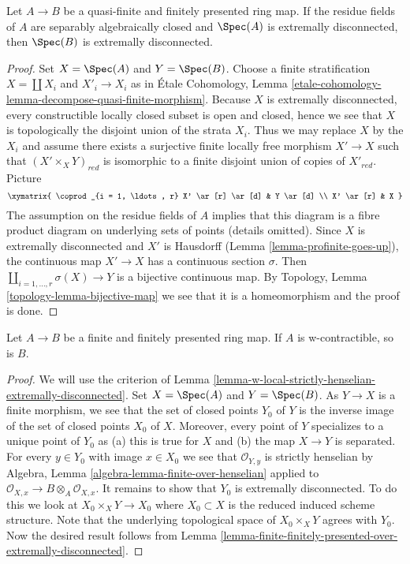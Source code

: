 \begin{lemma}
\label{lemma-finite-finitely-presented-over-extremally-disconnected}
Let $A \to B$ be a quasi-finite and finitely presented ring map.
If the residue fields of $A$ are separably algebraically closed
and $\Spec(A)$ is extremally disconnected, then $\Spec(B)$ is
extremally disconnected.
\end{lemma}

\begin{proof}
Set $X = \Spec(A)$ and $Y = \Spec(B)$. Choose a finite stratification
$X = \coprod X_i$ and $X'_i \to X_i$ as in
\'Etale Cohomology, Lemma
\ref{etale-cohomology-lemma-decompose-quasi-finite-morphism}.
Because $X$ is extremally disconnected, every constructible
locally closed subset is open and closed, hence we see that $X$
is topologically the disjoint union of the strata $X_i$. Thus we may
replace $X$ by the $X_i$ and assume there exists a surjective finite
locally free morphism $X' \to X$ such that $(X' \times_X Y)_{red}$
is isomorphic to a finite disjoint union of copies of $X'_{red}$.
Picture
$$
\xymatrix{
\coprod_{i = 1, \ldots, r} X' \ar[r] \ar[d] & Y \ar[d] \\
X' \ar[r] & X
}
$$
The assumption on the residue fields of $A$ implies that
this diagram is a fibre product diagram on underlying sets
of points (details omitted).
Since $X$ is extremally disconnected and $X'$ is Hausdorff
(Lemma \ref{lemma-profinite-goes-up}), the continuous map
$X' \to X$ has a continuous section $\sigma$. Then
$\coprod_{i = 1, \ldots, r} \sigma(X) \to Y$ is a bijective
continuous map. By
Topology, Lemma \ref{topology-lemma-bijective-map}
we see that it is a homeomorphism and the proof is done.
\end{proof}

\begin{lemma}
\label{lemma-finite-finitely-presented-over-w-contractible}
Let $A \to B$ be a finite and finitely presented ring map.
If $A$ is w-contractible, so is $B$.
\end{lemma}

\begin{proof}
We will use the criterion of
Lemma \ref{lemma-w-local-strictly-henselian-extremally-disconnected}.
Set $X = \Spec(A)$ and $Y = \Spec(B)$.
As $Y \to X$ is a finite morphism, we see that the set of closed
points $Y_0$ of $Y$ is the inverse image of the set of closed points
$X_0$ of $X$. Moreover, every point of $Y$ specializes to a unique
point of $Y_0$ as (a) this is true for $X$ and (b) the map
$X \to Y$ is separated. For every $y \in Y_0$ with image $x \in X_0$
we see that $\mathcal{O}_{Y, y}$ is strictly henselian by
Algebra, Lemma \ref{algebra-lemma-finite-over-henselian}
applied to $\mathcal{O}_{X, x} \to B \otimes_A \mathcal{O}_{X, x}$.
It remains to show that $Y_0$ is extremally disconnected.
To do this we look at $X_0 \times_X Y \to X_0$
where $X_0 \subset X$ is the reduced induced scheme structure.
Note that the underlying topological space of
$X_0 \times_X Y$ agrees with $Y_0$. Now the desired result follows from
Lemma \ref{lemma-finite-finitely-presented-over-extremally-disconnected}.
\end{proof}

